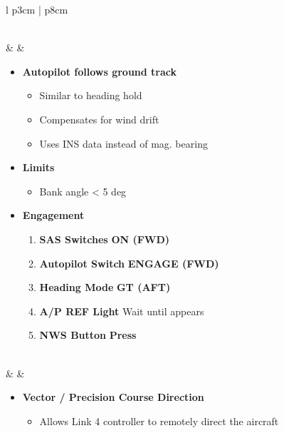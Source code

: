 \documentclass[8pt,usenames,dvipsnames,twoside]{article}
\begin{document}
\begin{center}
\begin{longtable}{l p{3cm} | p{8cm}}
\begin{minipage}[t]{\linewidth}
\begin{itemize}
\begin{enumerate}[label=(\alph*)]
						\end{enumerate} 
					\end{itemize}
				\end{minipage} \\
				\midrule 
				\textbullet &  & 
				\begin{minipage}[t]{\linewidth}
					\vspace{-7pt}
					\begin{itemize}
						\item \textbf{Autopilot follows ground track} 
						\begin{itemize}
							\item Similar to heading hold
							\item Compensates for wind drift
							\item Uses INS data instead of mag. bearing
						\end{itemize}
						\item \textbf{Limits}
						\begin{itemize}
							\item Bank angle < 5 deg
						\end{itemize}
						\item \textbf{Engagement}
						\begin{enumerate}[label=(\alph*)]
							\item \textbf{SAS Switches} \dotfill \textbf{ON (FWD)}
							\item \textbf{Autopilot Switch} \dotfill \textbf{ENGAGE (FWD)}
							\item \textbf{Heading Mode} \dotfill \textbf{GT (AFT)}
							\item \textbf{A/P REF Light} \dotfill Wait until appears
							\item \textbf{NWS Button} \dotfill \textbf{Press}
						\end{enumerate} 
					\end{itemize}
				\end{minipage} \\
				\midrule 
				\textbullet &  & 
				\begin{minipage}[t]{\linewidth}
					\vspace{-7pt}
					\begin{itemize}
						\item \textbf{Vector / Precision Course Direction} 
						\begin{itemize}
							\item Allows Link 4 controller to remotely direct the aircraft

\end{itemize}
\end{itemize}
\end{minipage}
\end{longtable}
\end{center}
\end{document}

